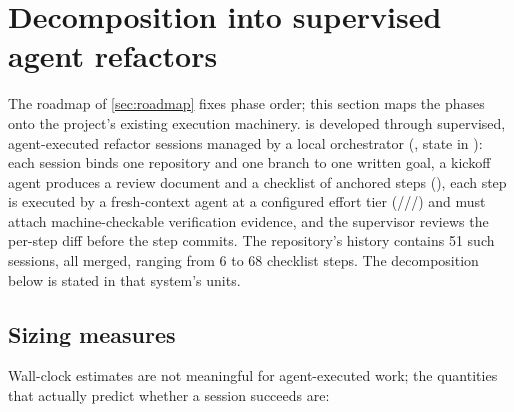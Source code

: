 \section{Decomposition into supervised agent refactors}
\label{sec:decomposition}

The roadmap of \cref{sec:roadmap} fixes phase order; this section maps
the phases onto the project's existing execution machinery. \dotnetrs{}
is developed through supervised, agent-executed refactor sessions
managed by a local orchestrator (, state in
): each session binds one repository and
one branch to one written goal, a kickoff agent produces a review
document and a checklist of anchored steps
(), each step is
executed by a fresh-context agent at a configured effort tier
(///) and must attach
machine-checkable verification evidence, and the supervisor reviews the
per-step diff before the step commits. The repository's history
contains 51 such sessions, all merged, ranging from 6 to 68 checklist
steps. The decomposition below is stated in that system's units.

\subsection{Sizing measures}
\label{sec:decomposition-measures}

Wall-clock estimates are not meaningful for agent-executed work; the
quantities that actually predict whether a session succeeds are:

